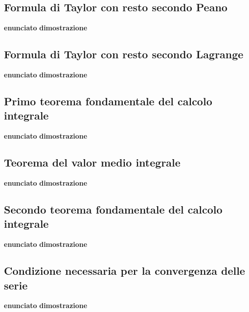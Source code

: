 \documentclass[a4paper, 9pt]{report}
\begin{document}
\newpage
\subsection*{Formula di Taylor con resto secondo Peano}
\textbf{enunciato}\newline
\textbf{dimostrazione}\newline







\newpage
\subsection*{Formula di Taylor con resto secondo Lagrange}
\textbf{enunciato}\newline
\textbf{dimostrazione}\newline






\newpage
\subsection*{Primo teorema fondamentale del calcolo integrale}
\textbf{enunciato}\newline
\textbf{dimostrazione}\newline






\newpage
\subsection*{Teorema del valor medio integrale}
\textbf{enunciato}\newline
\textbf{dimostrazione}\newline







\newpage
\subsection*{Secondo teorema fondamentale del calcolo integrale}
\textbf{enunciato}\newline
\textbf{dimostrazione}\newline






\newpage
\subsection*{Condizione necessaria per la convergenza delle serie}\textbf{enunciato}\newline
\textbf{dimostrazione}\newline
\end{document}
